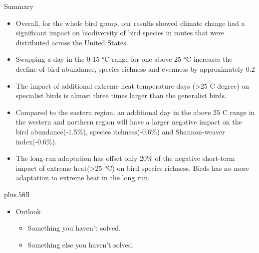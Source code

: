 \documentclass{beamer}
\begin{document}
\begin{frame}{Summary}

  \begin{itemize}
  \item
  Overall, for the whole bird group, our results showed climate change had a significant impact on biodiversity of bird species in routes that were distributed across the United States.
  \item
    Swapping a day in the 0-15 °C range for one above 25 °C increases the decline of bird abundance, species richness and evenness by approximately 0.2%
  \item
  The impact of additional extreme heat temperature days (>25 C degree) on specialist birds is almost three times larger than the generalist birds.
  \item
  Compared to the eastern region, an additional day in the above 25 C range in the western and northern region will have a larger negative impact on the bird abundance(-1.5\%), species richness(-0.6\%) and Shannon-weaver index(-0.6\%).
  \item The long-run adaptation has offset only 20\% of the negative short-term impact of extreme heat(>25 °C) on bird species richness. Birds has no more adaptation to extreme heat in the long run.

  \end{itemize}

  \vskip0pt plus.5fill
  \begin{itemize}
  \item
    Outlook
    \begin{itemize}
    \item
      Something you haven't solved.
    \item
      Something else you haven't solved.
    \end{itemize}
  \end{itemize}
\end{frame}
\end{document}
